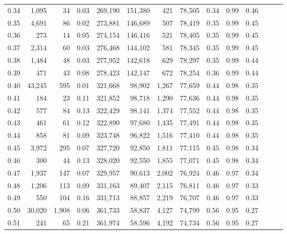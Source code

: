 \begin{tabular}{rrrrrrrrrrrrrr}
0.34 &   1,095 &      34 &  0.03 &  269,190 &  151,380 &     421 &  78,505 &  0.34 &  0.99 &      0.46 \\
0.35 &   4,691 &      86 &  0.02 &  273,881 &  146,689 &     507 &  78,419 &  0.35 &  0.99 &      0.45 \\
0.36 &     273 &      14 &  0.05 &  274,154 &  146,416 &     521 &  78,405 &  0.35 &  0.99 &      0.45 \\
0.37 &   2,314 &      60 &  0.03 &  276,468 &  144,102 &     581 &  78,345 &  0.35 &  0.99 &      0.45 \\
0.38 &   1,484 &      48 &  0.03 &  277,952 &  142,618 &     629 &  78,297 &  0.35 &  0.99 &      0.44 \\
0.39 &     471 &      43 &  0.08 &  278,423 &  142,147 &     672 &  78,254 &  0.36 &  0.99 &      0.44 \\
0.40 &  43,245 &     595 &  0.01 &  321,668 &   98,902 &   1,267 &  77,659 &  0.44 &  0.98 &      0.35 \\
0.41 &     184 &      23 &  0.11 &  321,852 &   98,718 &   1,290 &  77,636 &  0.44 &  0.98 &      0.35 \\
0.42 &     577 &      84 &  0.13 &  322,429 &   98,141 &   1,374 &  77,552 &  0.44 &  0.98 &      0.35 \\
0.43 &     461 &      61 &  0.12 &  322,890 &   97,680 &   1,435 &  77,491 &  0.44 &  0.98 &      0.35 \\
0.44 &     858 &      81 &  0.09 &  323,748 &   96,822 &   1,516 &  77,410 &  0.44 &  0.98 &      0.35 \\
0.45 &   3,972 &     295 &  0.07 &  327,720 &   92,850 &   1,811 &  77,115 &  0.45 &  0.98 &      0.34 \\
0.46 &     300 &      44 &  0.13 &  328,020 &   92,550 &   1,855 &  77,071 &  0.45 &  0.98 &      0.34 \\
0.47 &   1,937 &     147 &  0.07 &  329,957 &   90,613 &   2,002 &  76,924 &  0.46 &  0.97 &      0.34 \\
0.48 &   1,206 &     113 &  0.09 &  331,163 &   89,407 &   2,115 &  76,811 &  0.46 &  0.97 &      0.33 \\
0.49 &     550 &     104 &  0.16 &  331,713 &   88,857 &   2,219 &  76,707 &  0.46 &  0.97 &      0.33 \\
0.50 &  30,020 &   1,908 &  0.06 &  361,733 &   58,837 &   4,127 &  74,799 &  0.56 &  0.95 &      0.27 \\
0.51 &     241 &      65 &  0.21 &  361,974 &   58,596 &   4,192 &  74,734 &  0.56 &  0.95 &      0.27 \\

\end{tabular}
